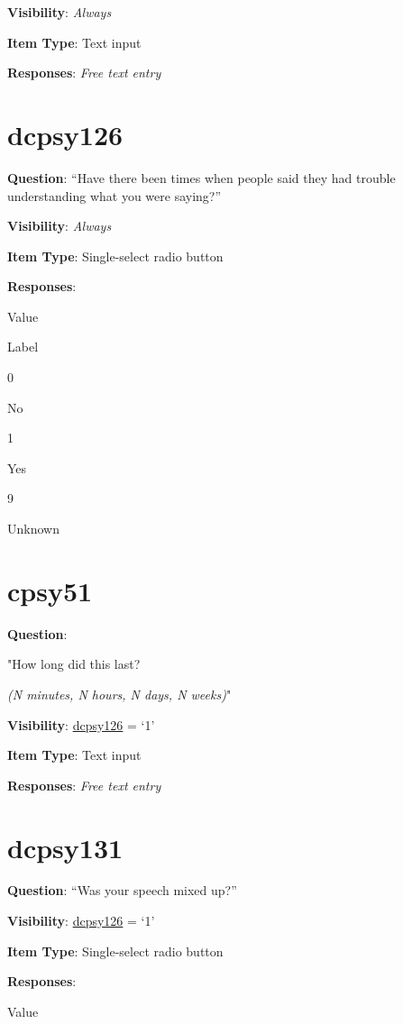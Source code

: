\documentclass[]{book}
\begin{document}
\textbf{Visibility}: \emph{Always}

\textbf{Item Type}: Text input

\textbf{Responses}: \emph{Free text entry}

\hypertarget{dcpsy126}{%
\section{dcpsy126}\label{dcpsy126}}

\textbf{Question}: ``Have there been times when people said they had trouble understanding what you were saying?''

\textbf{Visibility}: \emph{Always}

\textbf{Item Type}: Single-select radio button

\textbf{Responses}:

Value

Label

0

No

1

Yes

9

Unknown

\hypertarget{cpsy51}{%
\section{cpsy51}\label{cpsy51}}

\textbf{Question}:

"How long did this last?

\emph{(N minutes, N hours, N days, N weeks)}"

\textbf{Visibility}: \protect\hyperlink{dcpsy126}{dcpsy126} = `1'

\textbf{Item Type}: Text input

\textbf{Responses}: \emph{Free text entry}

\hypertarget{dcpsy131}{%
\section{dcpsy131}\label{dcpsy131}}

\textbf{Question}: ``Was your speech mixed up?''

\textbf{Visibility}: \protect\hyperlink{dcpsy126}{dcpsy126} = `1'

\textbf{Item Type}: Single-select radio button

\textbf{Responses}:

Value
\end{document}
